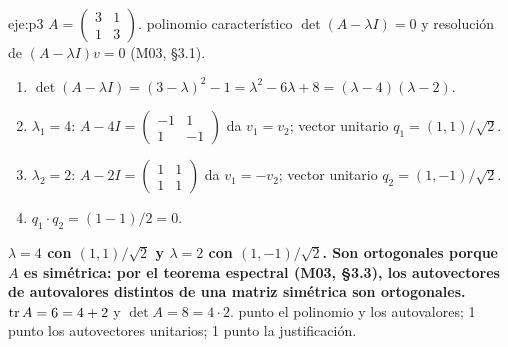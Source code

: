 \begin{solucion}{eje:p3}
\datos $A=\begin{pmatrix}3&1\\1&3\end{pmatrix}$.
\planteamiento polinomio característico $\det(A-\lambda I)=0$ y resolución de $(A-\lambda I)v=0$ (M03, §3.1).
\pasos
\begin{enumerate}[label=\arabic*.]
  \item $\det(A-\lambda I)=(3-\lambda)^{2}-1=\lambda^{2}-6\lambda+8=(\lambda-4)(\lambda-2)$.
  \item $\lambda_1=4$: $A-4I=\begin{pmatrix}-1&1\\1&-1\end{pmatrix}$ da $v_1=v_2$; vector unitario $q_1=(1,1)/\sqrt2$.
  \item $\lambda_2=2$: $A-2I=\begin{pmatrix}1&1\\1&1\end{pmatrix}$ da $v_1=-v_2$; vector unitario $q_2=(1,-1)/\sqrt2$.
  \item $q_1\cdot q_2=(1-1)/2=0$.
\end{enumerate}
\resultado \textbf{$\lambda=4$ con $(1,1)/\sqrt2$ y $\lambda=2$ con $(1,-1)/\sqrt2$. Son ortogonales porque $A$ es simétrica: por el teorema espectral (M03, §3.3), los autovectores de autovalores distintos de una matriz simétrica son ortogonales.}
\comprobacion $\operatorname{tr} A=6=4+2$ y $\det A=8=4\cdot 2$.
 punto el polinomio y los autovalores; 1 punto los autovectores unitarios; 1 punto la justificación.


\end{solucion}
